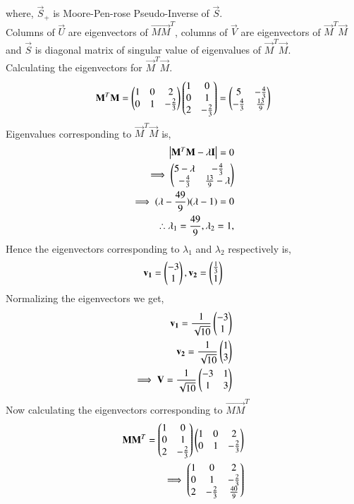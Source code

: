 \documentclass[journal,12pt,twocolumn]{IEEEtran}
\begin{document}
where, $\vec{S}_+$ is Moore-Pen-rose Pseudo-Inverse of $\vec{S}$.\\
Columns of $\vec{U}$ are eigenvectors of $\vec{MM}^T$, columns of $\vec{V}$ are eigenvectors of $\vec{M}^T\vec{M}$ and $\vec{S}$ is diagonal matrix of singular value of eigenvalues of $\vec{M}^T\vec{M}$.\\
Calculating the eigenvectors for $\vec{M}^T\vec{M}$.
\begin{align}
\mathbf{M}^T\mathbf{M} =  \begin{pmatrix}1&0&2\\0&1&-\frac{2}{3}\end{pmatrix} \begin{pmatrix}1&0\\0&1\\2&-\frac{2}{3}\end{pmatrix} = \begin{pmatrix}5&-\frac{4}{3}\\-\frac{4}{3}&\frac{13}{9}\end{pmatrix}
\end{align}
Eigenvalues corresponding to $\vec{M}^T\vec{M}$  is,
\begin{align}
\begin{vmatrix}\mathbf{M}^T\mathbf{M}-\lambda\mathbf{I}\end{vmatrix} = 0\\
\implies \begin{pmatrix}5-\lambda&-\frac{4}{3}\\-\frac{4}{3}&\frac{13}{9}-\lambda\end{pmatrix}\\
\implies (\lambda-\frac{49}{9})(\lambda-1) = 0\\
\therefore \lambda_1 = \frac{49}{9}, \lambda_2 = 1, \label{eq:lambda2}
\end{align} 
Hence the eigenvectors corresponding to $\lambda_1$ and $\lambda_2$ respectively is,
\begin{align}
\mathbf{v_1} =\begin{pmatrix}-3\\1\end{pmatrix}, \mathbf{v_2} =\begin{pmatrix}\frac{1}{3}\\1\end{pmatrix}
\end{align}
Normalizing the eigenvectors we get,
\begin{align}
\mathbf{v_1} = \frac{1}{\sqrt{10}}\begin{pmatrix}-3\\1\end{pmatrix}\\
\mathbf{v_2} = \frac{1}{\sqrt{10}}\begin{pmatrix}1\\3\end{pmatrix}\\
\implies \mathbf{V} = \frac{1}{\sqrt{10}}\begin{pmatrix}-3&1\\1&3\end{pmatrix}\label{eq:V}
\end{align}
Now calculating the eigenvectors corresponding to $\vec{MM}^T$
\begin{align}
\mathbf{MM}^T = \begin{pmatrix}1&0\\0&1\\2&-\frac{2}{3}\end{pmatrix}\begin{pmatrix}1&0&2\\0&1&-\frac{2}{3}\end{pmatrix} \\\implies \begin{pmatrix}1&0&2\\0&1&-\frac{2}{3}\\2&-\frac{2}{3}&\frac{40}{9}\end{pmatrix}
\end{align}
\end{document}

